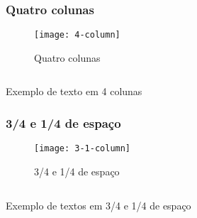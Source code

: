 \subsubsection{Quatro colunas}

\begin{figure}[!ht]
    \centering
    \texttt{[image: 4-column]}
    \caption{Quatro colunas}\label{RS0001:fig:4-column}
\end{figure}

\begin{code}
    \inputminted[label=1-4-column.html]{html}{../RS0001/anexos/4-column.html}
    \caption{Exemplo de texto em 4 colunas}\label{RS0001:code:exemplo-4-column}
\end{code}


\subsubsection{3/4 e 1/4 de espaço}

\begin{figure}[!ht]
    \centering
    \texttt{[image: 3-1-column]}
    \caption{3/4 e 1/4 de espaço}\label{RS0001:fig:3-1-column}
\end{figure}

\begin{code}
    \inputminted[label=3-1-column.html]{html}{../RS0001/anexos/3-1-column.html}
    \caption{Exemplo de textos em 3/4 e 1/4 de espaço}\label{RS0001:code:exemplo-3-1-column}
\end{code}